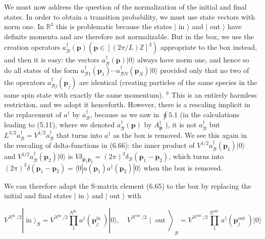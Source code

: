 \documentclass[10pt, letterpaper]{article}
\begin{document}
We must now address the question of the normalization of the initial and final states. In order to obtain a transition probability, we must use state vectors with norm one. In $\mathbb{R}^{3}$ this is problematic because the states $\mid$ in $\rangle$ and $\mid$ out $\rangle$ have definite momenta and are therefore not normalizable. But in the box, we use the creation operators $a_{\mathcal{B}}^{\dagger}(\mathbf{p})\left(\mathbf{p} \in[(2 \pi / L) \mathbb{Z}]^{3}\right)$ appropriate to the box instead, and then it is easy: the vectors $a_{\mathcal{B}}^{\dagger}(\mathbf{p})|0\rangle$ always have norm one, and hence so do all states of the form $a_{\mathcal{B} 1}^{\dagger}\left(\mathbf{p}_{1}\right) \cdots a_{\mathcal{B} N}^{\dagger}\left(\mathbf{p}_{N}\right)|0\rangle$ provided only that no two of the operators $a_{\mathcal{B} j}^{\dagger}\left(\mathbf{p}_{j}\right)$ are identical (creating particles of the same species in the same spin state with exactly the same momentum). ${ }^{9}$ This is an entirely harmless restriction, and we adopt it henceforth. However, there is a rescaling implicit in the replacement of $a^{\dagger}$ by $a_{\mathcal{B}}^{\dagger}$, because as we saw in $\oint 5.1$ (in the calculations leading to (5.11), where we denoted $a_{\mathcal{B}}^{\dagger}(\mathbf{p})$ by $A_{\mathbf{p}}^{\dagger}$ ), it is not $a_{\mathcal{B}}^{\dagger}$ but $L^{3 / 2} a_{\mathcal{B}}^{\dagger}=V^{1 / 2} a_{\mathcal{B}}^{\dagger}$ that turns into $a^{\dagger}$ as the box is removed. We see this again in the rescaling of delta-functions in (6.66): the inner product of $V^{1 / 2} a_{\mathcal{B}}^{\dagger}\left(\mathbf{p}_{1}\right)|0\rangle$ and $V^{1 / 2} a_{\mathcal{B}}^{\dagger}\left(\mathbf{p}_{2}\right)|0\rangle$ is $V \delta_{\mathbf{p}_{1} \mathbf{p}_{2}}=(2 \pi)^{3} \delta_{\mathcal{B}}\left(\mathbf{p}_{1}-\mathbf{p}_{2}\right)$, which turns into $(2 \pi)^{3} \delta\left(\mathbf{p}_{1}-\mathbf{p}_{2}\right)=\langle 0| a\left(\mathbf{p}_{1}\right) a^{\dagger}\left(\mathbf{p}_{2}\right)|0\rangle$ when the box is removed.

We can therefore adapt the S-matrix element (6.65) to the box by replacing the initial and final states $\mid$ in $\rangle$ and $\mid$ out $\rangle$ with

$$
\left.V^{N^{\text {in }} / 2}|\operatorname{in}\rangle_{\mathcal{B}}=V^{N^{\text {in }} / 2} \prod_{1}^{N^{\text {in }}} a^{\dagger}\left(\mathbf{p}_{j}^{\text {in }}\right)|0\rangle, \quad V^{N^{\text {out }} / 2} \mid \text { out }\right\rangle_{\mathcal{B}}=V^{N^{\text {out }} / 2} \prod_{1}^{N^{\text {out }}} a^{\dagger}\left(\mathbf{p}_{j}^{\text {out }}\right)|0\rangle
$$
\end{document}
